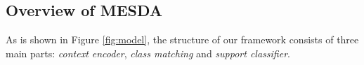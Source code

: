 \subsection{Overview of MESDA}
\label{sec:structure}
As is shown in Figure \ref{fig:model},
the structure of our framework
consists of three main parts: {\em context encoder}, {\em class matching}
and {\em support classifier}.

